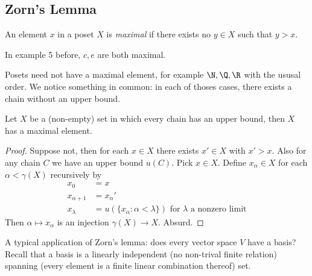 \documentclass[a4paper]{article}
\begin{document}
\subsection{Zorn's Lemma}

\begin{definition}
  An element \(x\) in a poset \(X\) is \emph{maximal} if there exists no \(y \in X\) such that \(y > x\).
\end{definition}

\begin{eg}
  In example 5 before, \(c, e\) are both maximal.
\end{eg}

Posets need not have a maximal element, for example \(\N, \Q, \R\) with the ususal order. We notice something in common: in each of thoses cases, there exists a chain without an upper bound.

\begin{theorem}
  Let \(X\) be a (non-empty) set in which every chain has an upper bound, then \(X\) has a maximal element.
\end{theorem}

\begin{proof}
  Suppose not, then for each \(x \in X\) there exists \(x' \in X\) with \(x' > x\). Also for any chain \(C\) we have an upper bound \(u(C)\). Pick \(x \in X\). Define \(x_\alpha \in X\) for each \(\alpha < \gamma(X)\) recursively by
  \begin{align*}
    x_0 &= x \\
    x_{\alpha + 1} &= x_\alpha' \\
    x_{\lambda} &= u(\{x_\alpha: \alpha < \lambda\}) \text{ for \(\lambda\) a nonzero limit}
  \end{align*}
  Then \(\alpha \mapsto x_\alpha\) is an injection \(\gamma(X) \to X\). Absurd.
\end{proof}

A typical application of Zorn's lemma: does every vector space \(V\) have a basis? Recall that a basis is a linearly independent (no non-trival finite relation) spanning (every element is a finite linear combination thereof) set.
\end{document}
